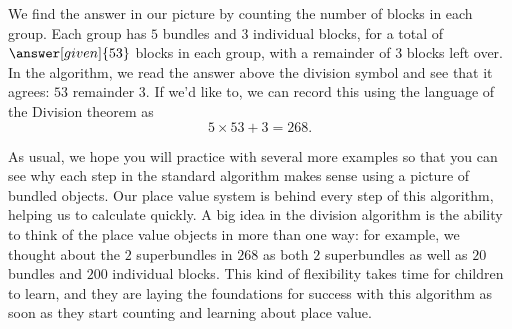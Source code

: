 \documentclass{ximera}
\begin{document}
\begin{example}
\begin{image}
\end{image}

We find the answer in our picture by counting the number of blocks in each group. Each group has $5$ bundles and $3$ individual blocks, for a total of $\answer[given]{53}$ blocks in each group, with a remainder of $3$ blocks left over. In the algorithm, we read the answer above the division symbol and see that it agrees: $53$ remainder $3$. If we'd like to, we can record this using the language of the Division theorem as
\[
5 \times 53 + 3 = 268.
\]

\end{example}

As usual, we hope you will practice with several more examples so that you can see why each step in the standard algorithm makes sense using a picture of bundled objects. Our place value system is behind every step of this algorithm, helping us to calculate quickly. A big idea in the division algorithm is the ability to think of the place value objects in more than one way: for example, we thought about the $2$ superbundles in $268$ as both $2$ superbundles as well as $20$ bundles and $200$ individual blocks. This kind of flexibility takes time for children to learn, and they are laying the foundations for success with this algorithm as soon as they start counting and learning about place value.
\end{document}
